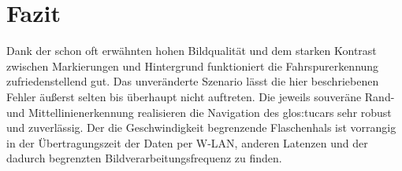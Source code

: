 





\section{Fazit \dcfirstauthorshort}
Dank der schon oft erwähnten hohen Bildqualität und dem starken Kontrast zwischen Markierungen und Hintergrund funktioniert die Fahrspurerkennung zufriedenstellend gut. Das unveränderte Szenario lässt die hier beschriebenen Fehler äußerst selten bis überhaupt nicht auftreten. Die jeweils souveräne Rand-und Mittellinienerkennung realisieren die Navigation des \gls{glos:tucar}s sehr robust und zuverlässig. Der die Geschwindigkeit begrenzende Flaschenhals ist vorrangig in der Übertragungszeit der Daten per W-LAN, anderen Latenzen und der dadurch begrenzten Bildverarbeitungsfrequenz zu finden. 

